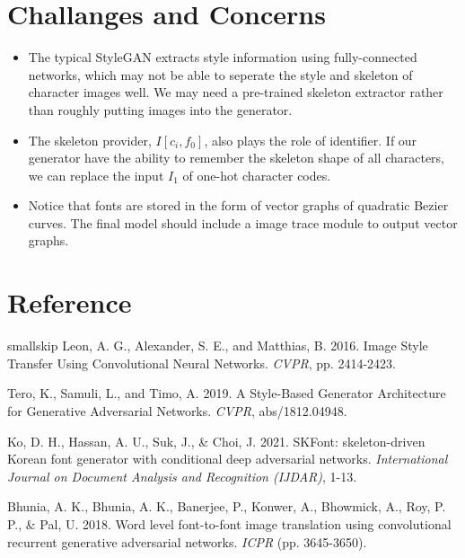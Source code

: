 \documentclass[letterpaper]{article}
\begin{document}
\section{Challanges and Concerns}
\begin{itemize}
    \item The typical StyleGAN extracts style information using fully-connected networks, which may not be able to seperate the style and skeleton of character images well. We may need a pre-trained skeleton extractor rather than roughly putting images into the generator.
    \item The skeleton provider, $I[c_i,f_0]$, also plays the role of identifier. If our generator have the ability to remember the skeleton shape of all characters, we can replace the input $I_1$ of one-hot character codes.
    \item Notice that fonts are stored in the form of vector graphs of quadratic Bezier curves. The final model should include a image trace module to output vector graphs.
\end{itemize}

\section{Reference}
smallskip \noindent
Leon, A. G., Alexander, S. E., and Matthias, B. 2016. Image Style Transfer Using Convolutional Neural Networks. \textit{CVPR}, pp. 2414-2423.

\smallskip \noindent
Tero, K., Samuli, L., and Timo, A. 2019. A Style-Based Generator Architecture for Generative Adversarial Networks. \textit{CVPR}, abs/1812.04948.

\smallskip \noindent
Ko, D. H., Hassan, A. U., Suk, J., \& Choi, J. 2021. SKFont: skeleton-driven Korean font generator with conditional deep adversarial networks. \textit{International Journal on Document Analysis and Recognition (IJDAR)}, 1-13.

\smallskip \noindent
Bhunia, A. K., Bhunia, A. K., Banerjee, P., Konwer, A., Bhowmick, A., Roy, P. P., \& Pal, U. 2018. Word level font-to-font image translation using convolutional recurrent generative adversarial networks. \textit{ICPR} (pp. 3645-3650).





\end{document}
